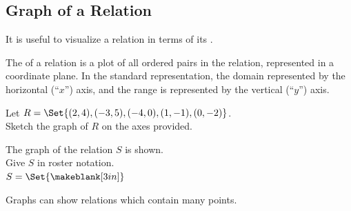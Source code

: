 \subsection{Graph of a Relation} 
It is useful to visualize a relation in terms of its .
\begin{definition}
The  of a relation is a plot of all ordered pairs in the relation, represented in a coordinate plane. In the standard representation, the domain represented by the horizontal (``$x$'') axis, and the range is represented by the vertical (``$y$'') axis.
\end{definition}
\begin{Example}
Let $R=\Set{(2,4), (-3,5), (-4,0), (1,-1), (0,-2)}$.\\Sketch the graph of $R$ on the axes provided.\\
\end{Example}
\begin{Example}
The graph of the relation $S$ is shown.\\
Give $S$ in roster notation.\\
$S=\Set{\makeblank[3in]}$\\
\end{Example}
Graphs can show relations which contain \makeblank[1.5in] many points.
